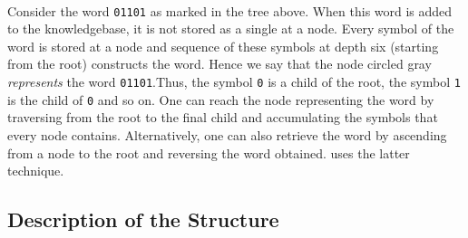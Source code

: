 

\paragraph{}	
Consider the word \texttt{01101} as marked in the tree above. When this word is added to the knowledgebase, it is not stored as a single \stringtype at a node. Every symbol of the word is stored at a node and sequence of these symbols at depth six (starting from the root) constructs the word. Hence we say that the node circled gray \emph{represents} the word \texttt{01101}.Thus, the symbol \texttt{0} is a child of the root, the symbol \texttt{1} is the child of \texttt{0} and so on. One can reach the node representing the word by traversing from the root to the final child and accumulating the symbols that every node contains. Alternatively, one can also retrieve the word by ascending from a node to the root and reversing the word obtained. \libalf uses the latter technique. 
\vskip 1pt
	
\subsection{Description of the Structure}
	
